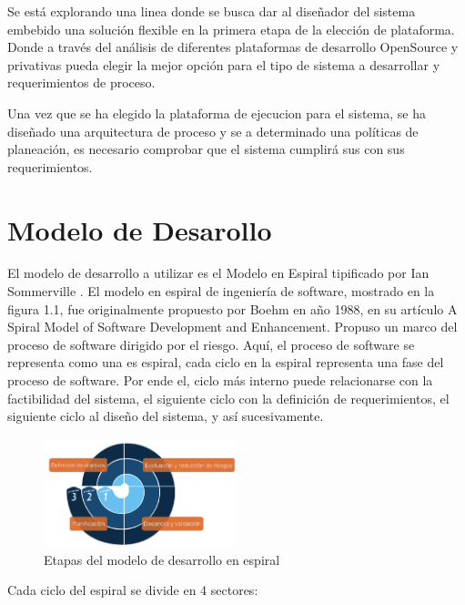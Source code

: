 Se está explorando una linea donde se busca dar al diseñador del sistema embebido una solución flexible en la primera etapa de la elección de plataforma. Donde a través del análisis de diferentes plataformas de desarrollo OpenSource y privativas pueda elegir la mejor opción para el tipo de sistema a desarrollar y requerimientos de proceso. 
 
Una vez que se ha elegido la plataforma de ejecucion para el sistema, se ha diseñado una arquitectura de proceso y se a determinado una políticas de planeación, es necesario comprobar que el sistema cumplirá sus con sus requerimientos.

\section{Modelo de Desarollo}

El modelo de desarrollo a utilizar es el Modelo en Espiral tipificado por Ian Sommerville\cite{Etiqueta00} . El modelo en espiral de ingeniería de software, mostrado en la figura 1.1, fue originalmente propuesto por Boehm en año 1988, en su artículo A Spiral Model of Software Development and Enhancement. Propuso un marco del proceso de software dirigido por el riesgo. Aquí, el proceso de software se representa como una es espiral, cada ciclo en la espiral representa una fase del proceso de software. Por ende el, ciclo más interno puede relacionarse con la factibilidad del sistema, el siguiente ciclo con la definición de requerimientos, el siguiente ciclo al diseño del sistema, y así sucesivamente.

\begin{figure}[h!]
 \begin{center}
  \includegraphics[width=0.5\textwidth,keepaspectratio=true]{./images/ESPIRAL}
  \caption{Etapas del modelo de desarrollo en espiral}
  \label{fig:esquema}
 \end{center}
\end{figure}


Cada ciclo del espiral se divide en 4 sectores:
 
